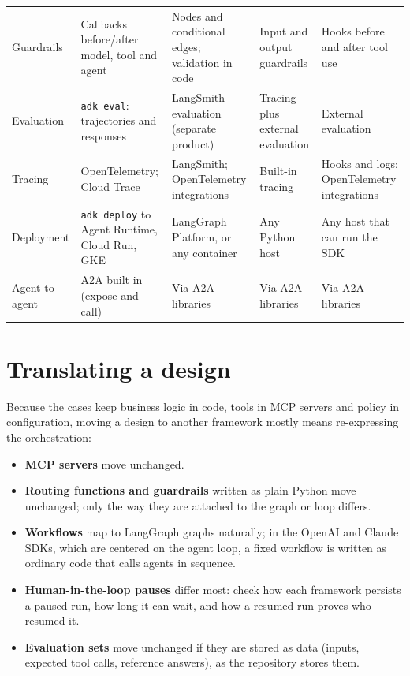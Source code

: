 \begin{xltabular}{\textwidth}{@{}>{\raggedright\arraybackslash}p{2.1cm}>{\raggedright\arraybackslash}X>{\raggedright\arraybackslash}X>{\raggedright\arraybackslash}X>{\raggedright\arraybackslash}X@{}}
Guardrails & Callbacks before/after model, tool and agent & Nodes and conditional edges; validation in code & Input and output guardrails & Hooks before and after tool use \\
Evaluation & \texttt{adk eval}: trajectories and responses & LangSmith evaluation (separate product) & Tracing plus external evaluation & External evaluation \\
Tracing & OpenTelemetry; Cloud Trace & LangSmith; OpenTelemetry integrations & Built-in tracing & Hooks and logs; OpenTelemetry integrations \\
Deployment & \texttt{adk deploy} to Agent Runtime, Cloud Run, GKE & LangGraph Platform, or any container & Any Python host & Any host that can run the SDK \\
Agent-to-agent & A2A built in (expose and call) & Via A2A libraries & Via A2A libraries & Via A2A libraries \\
\bottomrule
\end{xltabular}
\endgroup

\section{Translating a design}

Because the cases keep business logic in code, tools in MCP servers and policy in configuration, moving a design to another framework mostly means re-expressing the orchestration:
\begin{itemize}[itemsep=1pt]
  \item \textbf{MCP servers} move unchanged.
  \item \textbf{Routing functions and guardrails} written as plain Python move unchanged; only the way they are attached to the graph or loop differs.
  \item \textbf{Workflows} map to LangGraph graphs naturally; in the OpenAI and Claude SDKs, which are centered on the agent loop, a fixed workflow is written as ordinary code that calls agents in sequence.
  \item \textbf{Human-in-the-loop pauses} differ most: check how each framework persists a paused run, how long it can wait, and how a resumed run proves who resumed it.
  \item \textbf{Evaluation sets} move unchanged if they are stored as data (inputs, expected tool calls, reference answers), as the repository stores them.
\end{itemize}
